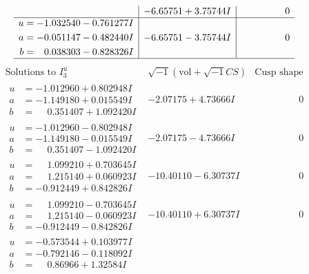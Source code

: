 \documentclass[1p]{elsarticle_modified}
\theoremstyle{definition}
\newcommand{\I}{\sqrt{-1}}
\begin{document}
$$\begin{array}{c|c|c}
 & -6.65751 + 3.75744 I & \phantom{-0.000000 } 0 \\ \hline\begin{aligned}
u &= -1.032540 - 0.761277 I \\
a &= -0.051147 - 0.482440 I \\
b &= \phantom{-}0.038303 - 0.828326 I\end{aligned}
 & -6.65751 - 3.75744 I & \phantom{-0.000000 } 0\\
 \hline 
 \end{array}$$\newpage$$\begin{array}{c|c|c}  
\text{Solutions to }I^u_{3}& \I (\text{vol} + \sqrt{-1}CS) & \text{Cusp shape}\\
 \hline 
\begin{aligned}
u &= -1.012960 + 0.802948 I \\
a &= -1.149180 + 0.015549 I \\
b &= \phantom{-}0.351407 + 1.092420 I\end{aligned}
 & -2.07175 + 4.73666 I & \phantom{-0.000000 } 0 \\ \hline\begin{aligned}
u &= -1.012960 - 0.802948 I \\
a &= -1.149180 - 0.015549 I \\
b &= \phantom{-}0.351407 - 1.092420 I\end{aligned}
 & -2.07175 - 4.73666 I & \phantom{-0.000000 } 0 \\ \hline\begin{aligned}
u &= \phantom{-}1.099210 + 0.703645 I \\
a &= \phantom{-}1.215140 + 0.060923 I \\
b &= -0.912449 + 0.842826 I\end{aligned}
 & -10.40110 - 6.30737 I & \phantom{-0.000000 } 0 \\ \hline\begin{aligned}
u &= \phantom{-}1.099210 - 0.703645 I \\
a &= \phantom{-}1.215140 - 0.060923 I \\
b &= -0.912449 - 0.842826 I\end{aligned}
 & -10.40110 + 6.30737 I & \phantom{-0.000000 } 0 \\ \hline\begin{aligned}
u &= -0.573544 + 0.103977 I \\
a &= -0.792146 - 0.118092 I \\
b &= \phantom{-}0.86966 + 1.32584 I\end{aligned}

\end{array}$$
\end{document}
